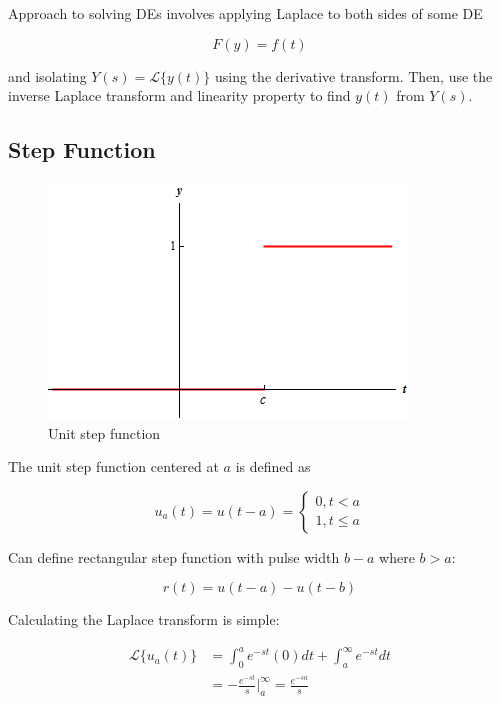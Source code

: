 Approach to solving DEs involves applying Laplace to both sides of some DE

\begin{equation*}
    F(y)=f(t)
\end{equation*}

and isolating $Y(s)=\mathcal{L}\{y(t)\}$ using the derivative transform. Then, use
the inverse Laplace transform and linearity property to find $y(t)$ from $Y(s)$.

\subsection{Step Function}

\begin{figure}[H]
    \centering
    \includegraphics[scale=.5]{figures/unitstep.png}
    \caption{Unit step function}
\end{figure}

The unit step function centered at $a$ is defined as

$$
u_a(t)=u(t-a)=\begin{cases}
    0,t<a\\
    1,t\leq a
\end{cases}
$$

Can define rectangular step function with pulse width $b-a$ where $b>a$:

\begin{equation*}
    r(t)=u(t-a)-u(t-b)
\end{equation*}

Calculating the Laplace transform is simple:

\begin{align*}
    \mathcal{L}\{u_a(t)\}&=\int_0^a e^{-st}(0)dt + \int_a^\infty e^{-st}dt\\
    &=-\frac{e^{-st}}{s}\bigg\vert_a^\infty=\frac{e^{-sa}}{s}
\end{align*}

